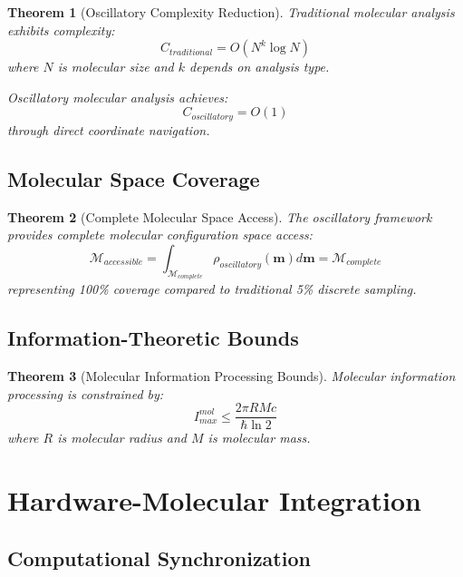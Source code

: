 \documentclass[12pt,a4paper]{article}
\newtheorem{theorem}{Theorem}[section]
\begin{document}
\begin{theorem}[Oscillatory Complexity Reduction]
Traditional molecular analysis exhibits complexity:
\begin{equation}
C_{traditional} = O(N^k \log N)
\end{equation}
where $N$ is molecular size and $k$ depends on analysis type.

Oscillatory molecular analysis achieves:
\begin{equation}
C_{oscillatory} = O(1)
\end{equation}
through direct coordinate navigation.
\end{theorem}

\subsection{Molecular Space Coverage}

\begin{theorem}[Complete Molecular Space Access]
The oscillatory framework provides complete molecular configuration space access:
\begin{equation}
\mathcal{M}_{accessible} = \int_{\mathcal{M}_{complete}} \rho_{oscillatory}(\mathbf{m}) d\mathbf{m} = \mathcal{M}_{complete}
\end{equation}
representing 100\% coverage compared to traditional 5\% discrete sampling.
\end{theorem}

\subsection{Information-Theoretic Bounds}

\begin{theorem}[Molecular Information Processing Bounds]
Molecular information processing is constrained by:
\begin{equation}
I_{max}^{mol} \leq \frac{2\pi R M c}{\hbar \ln 2}
\end{equation}
where $R$ is molecular radius and $M$ is molecular mass.
\end{theorem}

\section{Hardware-Molecular Integration}

\subsection{Computational Synchronization}
\end{document}
